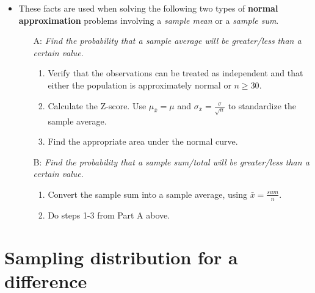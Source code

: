 \begin{itemize}
\item These facts are used when solving the following two types of \textbf{normal approximation} problems involving a \emph{sample mean} or a \emph{sample sum}.  
\begin{itemize}
\item[A:] \textit{Find the probability that a sample average will be greater/less than a certain value}.
\begin{enumerate}\vspace{-1mm}
\setlength{\itemsep}{0mm}
\item Verify that the observations can be treated as independent and that either the population is approximately normal or $n \ge 30$.
\item Calculate the Z-score.  Use $\mu_{\bar{x}}=\mu$ and $\sigma_{\bar{x}}=\frac{\sigma}{\sqrt{n}}$ to standardize the sample average.  
\item Find the appropriate area under the normal curve.  
\end{enumerate}

\item[B:] \textit{Find the probability that a sample sum/total will be greater/less than a certain value}.
\begin{enumerate}\vspace{-1mm}
\setlength{\itemsep}{0mm}
\item Convert the sample sum into a sample average, using $\bar{x} = \frac{sum}{n}$.  
\item Do steps 1-3 from Part A above.
\end{enumerate}
\end{itemize}
\end{itemize}

{}


\section[Sampling distribution for a difference of proportions or means]{Sampling distribution for a difference}
\label{distributionofdifference}

